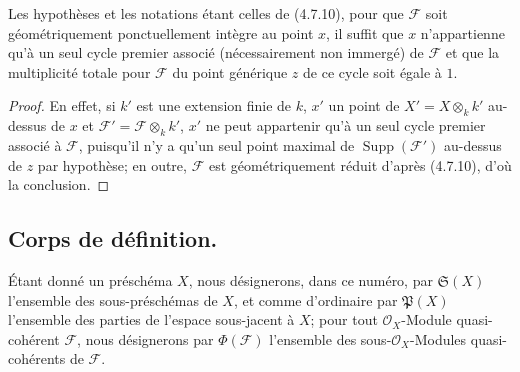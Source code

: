 \begin{proposition}[4.7.13]
\label{IV.2.4.7.13-fr}
Les hypothèses et les notations étant celles de \textup{(4.7.10)}, pour que
$\mathscr F$ soit géométriquement ponctuellement intègre au point $x$, il
suffit que $x$ n'appartienne qu'à un seul cycle premier associé
(nécessairement non immergé) de $\mathscr F$ et que la multiplicité totale
pour $\mathscr F$ du point générique $z$ de ce cycle soit égale à $1$.
\end{proposition}

\begin{proof}
En effet, si $k'$ est une extension finie de $k$, $x'$ un point de
$X'=X\otimes_k k'$ au-dessus de $x$ et
$\mathscr F'=\mathscr F\otimes_k k'$, $x'$ ne peut appartenir qu'à un seul
cycle premier associé à $\mathscr F$, puisqu'il n'y a qu'un seul point
maximal de $\operatorname{Supp}(\mathscr F')$ au-dessus de $z$ par hypothèse;
en outre, $\mathscr F$ est géométriquement réduit d'après (4.7.10), d'où la
conclusion.
\end{proof}
\subsection{Corps de définition.}
\label{subsection:IV.4.8-fr}

\begin{env}[4.8.1]
\label{IV.2.4.8.1-fr}
Étant donné un préschéma $X$, nous désignerons, dans ce numéro, par
$\mathfrak S(X)$ l'ensemble des sous-préschémas de $X$, et comme d'ordinaire
par $\mathfrak P(X)$ l'ensemble des parties de l'espace sous-jacent à $X$;
pour tout $\mathcal O_X$-Module quasi-cohérent $\mathscr F$, nous désignerons
par $\Phi(\mathscr F)$ l'ensemble des sous-$\mathcal O_X$-Modules
quasi-cohérents de $\mathscr F$.
\end{env}

